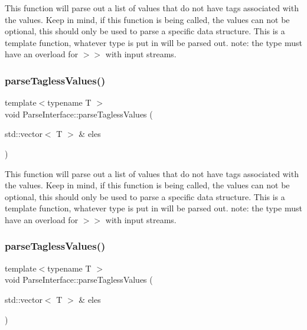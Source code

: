 This function will parse out a list of values that do not have tags associated with the values. Keep in mind, if this function is being called, the values can not be optional, this should only be used to parse a specific data structure. This is a template function, whatever type is put in will be parsed out. note\+: the type must have an overload for $>$$>$ with input streams. \mbox{\label{classParseInterface_a60c8afbe5369965c8855491bb3f75668}} 
\subsubsection{\texorpdfstring{parse\+Tagless\+Values()}{parseTaglessValues()}\hspace{0.1cm}{\footnotesize\ttfamily [2/3]}}
{\footnotesize\ttfamily template$<$typename T $>$ \\
void Parse\+Interface\+::parse\+Tagless\+Values (\begin{DoxyParamCaption}\item[{std\+::vector$<$ T $>$ \&}]{eles }\end{DoxyParamCaption})}

This function will parse out a list of values that do not have tags associated with the values. Keep in mind, if this function is being called, the values can not be optional, this should only be used to parse a specific data structure. This is a template function, whatever type is put in will be parsed out. note\+: the type must have an overload for $>$$>$ with input streams. \mbox{\label{classParseInterface_a60c8afbe5369965c8855491bb3f75668}} 
\subsubsection{\texorpdfstring{parse\+Tagless\+Values()}{parseTaglessValues()}\hspace{0.1cm}{\footnotesize\ttfamily [3/3]}}
{\footnotesize\ttfamily template$<$typename T $>$ \\
void Parse\+Interface\+::parse\+Tagless\+Values (\begin{DoxyParamCaption}\item[{std\+::vector$<$ T $>$ \&}]{eles }\end{DoxyParamCaption})}

